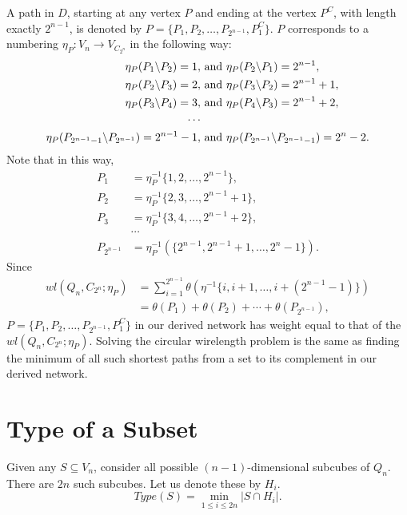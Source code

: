 \documentclass[12pt]{ucthesis}
\theoremstyle{plain}
\theoremstyle{definition}
\begin{document}
A path in $D$, starting at any vertex $P$ and ending at the vertex $P^C$,
with length exactly $2^{n - 1}$,
is denoted by $P = \{P_1, P_2, \dots, P_{2^{n - 1}}, P_1^C\}$.
$P$ corresponds to a numbering $\eta_P \colon V_n \rightarrow V_{C_{2^n}}$ in the following way:
\begin{align*}
\eta_P(P_1 \backslash P_2) = 1, & \textnormal{ and }
\eta_P(P_2 \backslash P_1) = 2^{n - 1}, \\
\eta_P(P_2 \backslash P_3) = 2, & \textnormal{ and }
\eta_P(P_3 \backslash P_2) = 2^{n - 1} + 1, \\
\eta_P(P_3 \backslash P_4) = 3, & \textnormal{ and }
\eta_P(P_4 \backslash P_3) = 2^{n - 1} + 2, \\
\cdots \\
\eta_P(P_{2^{n - 1} - 1} \backslash P_{2^{n - 1}}) = 2^{n - 1} - 1, & \textnormal{ and }
\eta_P(P_{2^{n - 1}} \backslash P_{2^{n - 1} - 1}) = 2^n - 2.
\end{align*}
Note that in this way,
\begin{align*}
P_1 & = \eta_P^{-1}\{1, 2, \dots, 2^{n - 1}\}, \\
P_2 & = \eta_P^{-1}\{2, 3, \dots, 2^{n - 1} + 1\}, \\
P_3 & = \eta_P^{-1}\{3, 4, \dots, 2^{n - 1} + 2\}, \\
& \cdots \\
P_{2^{n - 1}} & = \eta_P^{-1}(\{2^{n - 1}, 2^{n - 1} + 1, \dots, 2^n - 1\}).
\end{align*}
Since
\begin{align*}
wl(Q_n, C_{2^n}; \eta_P)
& = \sum_{i = 1}^{2^{n - 1}} \theta(\eta^{-1}\{i, i + 1, \dots, i + (2^{n - 1} - 1)\}) \\
& = \theta(P_1) + \theta(P_2) + \cdots + \theta(P_{2^{n - 1}}),
\end{align*}
$P = \{P_1, P_2, \dots, P_{2^{n - 1}}, P_1^C\}$ in our derived network has weight
equal to that of the $wl(Q_n, C_{2^n}; \eta_P)$.
Solving the circular wirelength problem is the same as finding the minimum
of all such shortest paths from a set to its complement in our derived network.

\section{Type of a Subset}
\label{Section 2.4}

Given any $S \subseteq V_n$,
consider all possible $(n - 1)$-dimensional subcubes of $Q_n$.
There are $2 n$ such subcubes.
Let us denote these by $H_i$.
\begin{equation*}
Type(S) = \min_{1 \le i \le 2 n} |S \cap H_i|.
\end{equation*}
\end{document}
